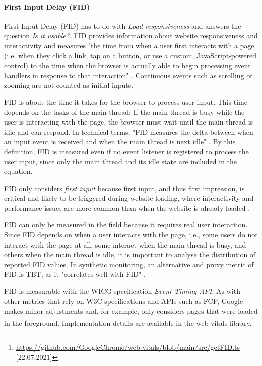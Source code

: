 
\paragraph{First Input Delay (FID)} %


First Input Delay (FID) has to do with \textit{Load responsiveness} and answers the question \textit{Is it usable?}.
FID provides information about website responsiveness and interactivity and measures "the time from when a user first interacts with a page (i.e. when they click a link, tap on a button, or use a custom, JavaScript-powered control) to the time when the browser is actually able to begin processing event handlers in response to that interaction" \cite{2020WaltonFID}.
Continuous events such as scrolling or zooming are not counted as initial inputs.

FID is about the time it takes for the browser to process user input.
This time depends on the tasks of the main thread:
If the main thread is busy while the user is interacting with the page, the browser must wait until the main thread is idle and can respond.
In technical terms, "FID measures the delta between when an input event is received and when the main thread is next idle" \cite{2020WaltonFID}.
By this definition, FID is measured even if no event listener is registered to process the user input, since only the main thread and its idle state are included in the equation.

FID only considers \textit{first input} because first input, and thus first impression, is critical and likely to be triggered during website loading, where interactivity and performance issues are more common than when the website is already loaded \cite{2020WaltonFID}.


FID can only be measured in the field because it requires real user interaction.
Since FID depends on when a user interacts with the page, i.e., some users do not interact with the page at all, some interact when the main thread is busy, and others when the main thread is idle, it is important to analyse the distribution of reported FID values.
In synthetic monitoring, an alternative and proxy metric of FID is TBT, as it "correlates well with FID" \cite{2020WaltonFID}.


FID is measurable with the WICG specification \textit{Event Timing API}.
As with other metrics that rely on W3C specifications and APIs such as FCP, Google makes minor adjustments and, for example, only considers pages that were loaded in the foreground.
Implementation details are available in the web-vitals library.\footnote{\url{https://github.com/GoogleChrome/web-vitals/blob/main/src/getFID.ts} [22.07.2021]}


